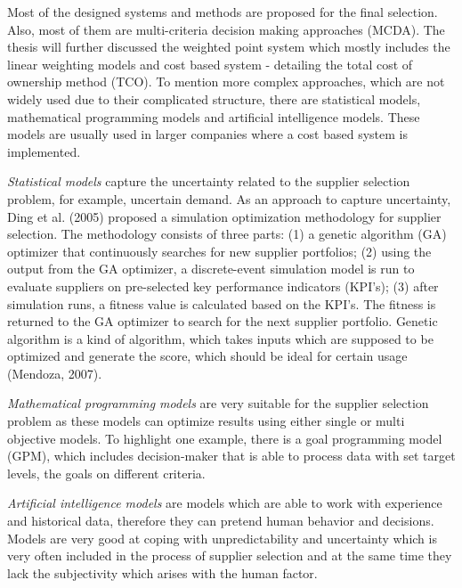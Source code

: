 \documentclass[oneside,12pt]{article}%
\begin{document}
Most of the designed systems and methods are proposed for the final selection. Also, most of them are multi-criteria decision making approaches (MCDA). The thesis will further discussed the weighted point system which mostly includes the linear weighting models and cost based system - detailing the total cost of ownership method (TCO). To mention more complex approaches, which are not widely used due to their complicated structure, there are statistical models, mathematical programming models and artificial intelligence models. These models are usually used in larger companies where a cost based system is implemented.\par
\emph{Statistical models} capture the uncertainty related to the supplier selection problem, for example, uncertain demand. As an approach to capture uncertainty, Ding et al. (2005) proposed a simulation optimization methodology for supplier selection. The methodology consists of three parts: (1) a genetic algorithm (GA) optimizer that continuously searches for new supplier portfolios; (2) using the output from the GA optimizer, a discrete-event simulation model is run to evaluate suppliers on pre-selected key performance indicators (KPI’s); (3) after simulation runs, a fitness value is calculated based on the KPI’s. The fitness is returned to the GA optimizer to search for the next supplier portfolio. Genetic algorithm is a kind of algorithm, which takes inputs which are supposed to be optimized and generate the score, which should be ideal for certain usage (Mendoza, 2007).\par
\emph{Mathematical programming models} are very suitable for the supplier selection problem as these models can optimize results using either single or multi objective models. To highlight one example, there is a goal programming model (GPM), which includes decision-maker that is able to process data with set target levels, the goals on different criteria. \par
\emph{Artificial intelligence models} are models which are able to work with experience and historical data, therefore they can pretend human behavior and decisions. Models are very good at coping with unpredictability and uncertainty which is very often included in the process of supplier selection and at the same time they lack the subjectivity which arises with the human factor.


\end{document}
